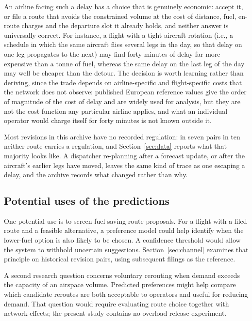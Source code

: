 \documentclass[preprint,authoryear,12pt]{elsarticle}
\begin{document}
An airline facing such a delay has a choice that is genuinely economic:
accept it, or file a route that avoids the constrained volume at the
cost of distance, fuel, en-route charges and the departure slot it
already holds, and neither answer is universally correct. For
instance, a flight with a tight aircraft rotation (i.e., a schedule in
which the same aircraft flies several legs in the day, so that delay
on one leg propagates to the next) may find forty minutes of delay far
more expensive than a tonne of fuel, whereas the same delay on the
last leg of the day may well be cheaper than the detour. The decision
is worth learning rather than deriving, since the trade depends on
airline-specific and flight-specific costs that the network does not
observe: published European reference values \citep{cook2015} give
the order of magnitude of the cost of delay and are widely used for
analysis, but they are not the cost function any particular airline
applies, and what an individual operator would charge itself for forty
minutes is not known outside it.

Most revisions in this archive have no recorded regulation: in
seven pairs in ten neither route carries a regulation, and
Section~\ref{sec:data} reports what that majority looks like. A
dispatcher re-planning after a forecast update, or after the aircraft's
earlier legs have moved, leaves the same kind of trace as one escaping a
delay, and the archive records what changed rather than why.

\subsection{Potential uses of the predictions}
\label{sec:usecases}

One potential use is to screen fuel-saving route proposals. For a flight
with a filed route and a feasible alternative, a preference model could
help identify when the lower-fuel option is also likely to be chosen.
A confidence threshold would allow the system to withhold uncertain
suggestions. Section~\ref{sec:channel} examines that principle on
historical revision pairs, using subsequent filings as the reference.

A second research question concerns voluntary rerouting when demand
exceeds the capacity of an airspace volume. Predicted preferences might
help compare which candidate reroutes are both acceptable to operators
and useful for reducing demand. That question would require evaluating
route choice together with network effects; the present study contains
no overload-release experiment.
\end{document}

